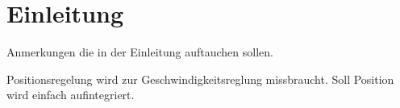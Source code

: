 \chapter{Einleitung}
\label{chap:Einleitung}


Anmerkungen die in der Einleitung auftauchen sollen.

Positionsregelung wird zur Geschwindigkeitsreglung missbraucht. Soll Position wird einfach aufintegriert.
